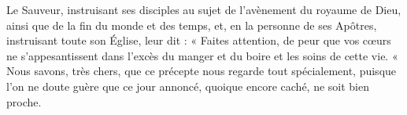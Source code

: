 Le Sauveur, instruisant ses disciples au sujet de l’avènement du royaume de Dieu, ainsi que de la fin du monde et des temps, et, en la personne de ses Apôtres, instruisant toute son Église, leur dit : « Faites attention, de peur que vos cœurs ne s’appesantissent dans l’excès du manger et du boire et les soins de cette vie. « Nous savons, très chers, que ce précepte nous regarde tout spécialement, puisque l’on ne doute guère que ce jour annoncé, quoique encore caché, ne soit bien proche.